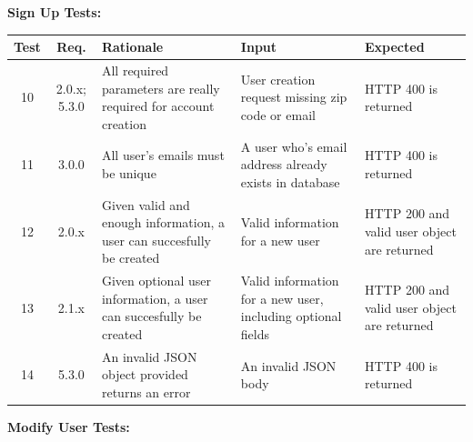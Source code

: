 \documentclass[12pt]{article}
\begin{document}
\textbf{Sign Up Tests:}

\setlength{\tabcolsep}{3mm}
\begin{tabular}{|c|c|p{5cm}|p{3cm}|p{3cm}|}
    \hline
    Test & Req.         & Rationale                                                             & Input                                                       & Expected                                    \\

    \hline
    10   & 2.0.x; 5.3.0 & All required parameters are really required for account creation      & User creation request missing zip code or email             & HTTP 400 is returned                        \\
    \hline
    11   & 3.0.0        & All user's emails must be unique                                      & A user who's email address already exists in database       & HTTP 400 is returned                        \\
    \hline
    12   & 2.0.x        & Given valid and enough information, a user can succesfully be created & Valid information for a new user                            & HTTP 200 and valid user object are returned \\
    \hline
    13   & 2.1.x        & Given optional user information, a user can succesfully be created    & Valid information for a new user, including optional fields & HTTP 200 and valid user object are returned \\
    \hline
    14   & 5.3.0        & An invalid JSON object provided returns an error                      & An invalid JSON body                                        & HTTP 400 is returned                        \\
    \hline
\end{tabular}

\textbf{Modify User Tests:}
\end{document}
